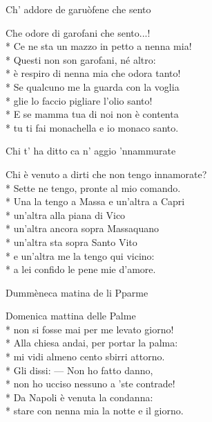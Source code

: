 \documentclass[11pt]{book}
\begin{document}
\begin{poem}{Ch’ addore de garuòfene che sento}{}
\settowidth{\versewidth}{Ce ne sta un mazzo in petto a nenna mia}
\begin{altverse}
Che odore di garofani che sento...!\\*
Ce ne sta un mazzo in petto a nenna mia!\\*
Questi non son garofani, né altro:\\*
è respiro di nenna mia che odora tanto!\\*
Se qualcuno me la guarda con la voglia\\*
glie lo faccio pigliare l’olio santo!\\*
E se mamma tua di noi non è contenta\\*
tu ti fai monachella e io monaco santo.
\end{altverse}
\end{poem}

\begin{poem}{Chi t’ ha ditto ca n’ aggio ’nnammurate}{}
\settowidth{\versewidth}{Chi è venuto a dirti che non tengo innamorate}
\begin{altverse}
Chi è venuto a dirti che non tengo innamorate?\\*
Sette ne tengo, pronte al mio comando.\\*
Una la tengo a Massa e un’altra a Capri\\*
un’altra alla piana di Vico\\*
un’altra ancora sopra Massaquano\\*
un’altra sta sopra Santo Vito\\*
e un’altra me la tengo qui vicino:\\*
a lei confido le pene mie d’amore.
\end{altverse}
\end{poem}

\begin{poem}{Dummèneca matina de li Pparme}{}
\settowidth{\versewidth}{Stare con nenna mia la notte e il giorno}
\begin{altverse}
Domenica mattina delle Palme\\*
non si fosse mai per me levato giorno!\\*
Alla chiesa andai, per portar la palma:\\*
mi vidi almeno cento sbirri attorno.\\*
Gli dissi: — Non ho fatto danno,\\*
non ho ucciso nessuno a ’ste contrade!\\*
Da Napoli è venuta la condanna:\\*
stare con nenna mia la notte e il giorno.
\end{altverse}
\end{poem}
\end{document}
